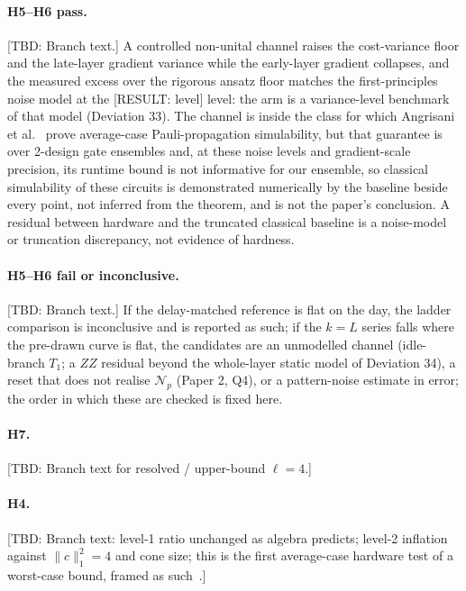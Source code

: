 \documentclass[aps,prxquantum,reprint,superscriptaddress,nofootinbib,longbibliography,amsmath,amssymb]{revtex4-2}
\newcommand{\placeholder}[1]{\textcolor{red!70!black}{[RESULT: #1]}}
\newcommand{\tbd}[1]{\textcolor{orange!80!black}{[TBD: #1]}}
\newcommand{\Np}{\mathcal{N}_p}
\begin{document}
\paragraph{H5--H6 pass.} \tbd{Branch text.} A controlled non-unital channel raises the cost-variance floor and the late-layer gradient variance while the early-layer gradient collapses, and the measured excess over the rigorous ansatz floor matches the first-principles noise model at the \placeholder{level} level: the arm is a variance-level benchmark of that model (Deviation 33). The channel is inside the class for which Angrisani et al.~\cite{Angrisani2026} prove average-case Pauli-propagation simulability, but that guarantee is over 2-design gate ensembles and, at these noise levels and gradient-scale precision, its runtime bound is not informative for our ensemble, so classical simulability of these circuits is demonstrated numerically by the baseline beside every point, not inferred from the theorem, and is not the paper's conclusion. A residual between hardware and the truncated classical baseline is a noise-model or truncation discrepancy, not evidence of hardness.

\paragraph{H5--H6 fail or inconclusive.} \tbd{Branch text.} If the delay-matched reference is flat on the day, the ladder comparison is inconclusive and is reported as such; if the $k = L$ series falls where the pre-drawn curve is flat, the candidates are an unmodelled channel (idle-branch $T_1$; a $ZZ$ residual beyond the whole-layer static model of Deviation 34), a reset that does not realise $\Np$ (Paper 2, Q4), or a pattern-noise estimate in error; the order in which these are checked is fixed here.

\paragraph{H7.} \tbd{Branch text for resolved / upper-bound $\ell = 4$.}

\paragraph{H4.} \tbd{Branch text: level-1 ratio unchanged as algebra predicts; level-2 inflation against $\|c\|_1^2 = 4$ and cone size; this is the first average-case hardware test of a worst-case bound, framed as such~\cite{Larocca2025,Quek2024}.}
\end{document}
